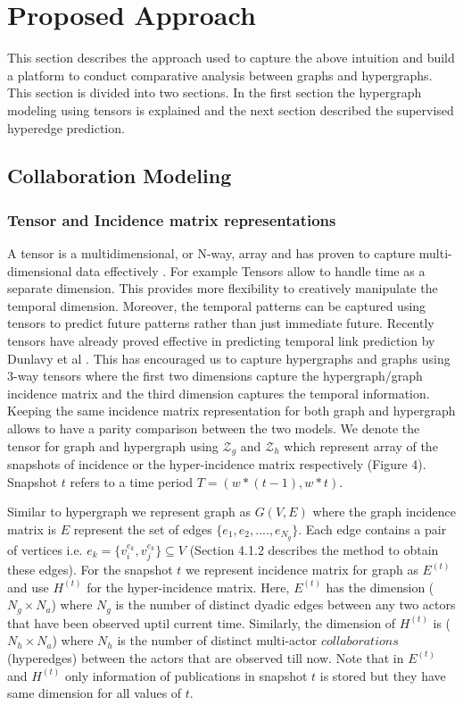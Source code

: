 \documentclass[twoside,leqno,twocolumn]{article}
\begin{document}
\section{Proposed Approach}

This section describes the approach used to capture the above intuition and build a platform to conduct comparative analysis between graphs and hypergraphs. This section is divided into two sections. In the first section the hypergraph modeling using tensors is explained and the next section described the supervised hyperedge prediction. 

\subsection{Collaboration Modeling}

\subsubsection{Tensor and Incidence matrix representations}

A tensor is a multidimensional, or N-way, array \cite{pearson2012spectral} and has proven to capture multi-dimensional data effectively \cite{kolda07}. For example Tensors allow to handle time as a separate dimension. This provides more flexibility to creatively manipulate the temporal dimension. Moreover, the temporal patterns can be captured using tensors to predict future patterns rather than just immediate future. Recently tensors have already proved effective in predicting temporal link prediction by Dunlavy et al \cite{kolda11}. This has encouraged us to capture hypergraphs and graphs using 3-way tensors where the first two dimensions capture the hypergraph/graph incidence matrix and the third dimension captures the temporal information. Keeping the same incidence matrix representation for both graph and hypergraph allows to have a parity comparison between the two models. 
We denote the tensor for graph and hypergraph using $\mathscr{Z}_{g}$ and $\mathscr{Z}_{h}$ which represent array of the snapshots of incidence or the hyper-incidence matrix respectively (Figure 4). Snapshot \(t\) refers to a time period \(T=(w*(t-1), w*t)\). 

Similar to hypergraph we represent graph as \(G(V,E)\) where the graph incidence matrix is \(E\) represent the set of edges $\{e_1,e_2,....,e_{N_g}\}$. Each edge contains a pair of vertices i.e. \(e_k=\{v_i^{e_k},v_j^{e_k}\} \subseteq V\) (Section 4.1.2 describes the method to obtain these edges). For the snapshot \(t\) we represent incidence matrix for graph as \(E^{(t)}\) and use \(H^{(t)}\) for the hyper-incidence matrix. Here, \(E^{(t)}\) has the dimension (\(N_{g}\times N_{a}\)) where \(N_{g}\) is the number of distinct dyadic edges between any two actors that have been observed uptil current time. Similarly, the dimension of \(H^{(t)}\) is (\(N_{h}\times N_{a}\)) where \(N_{h}\) is the number of distinct multi-actor $collaborations$ (hyperedges) between the actors that are observed till now. Note that in \(E^{(t)}\) and \(H^{(t)}\) only information of publications in snapshot $t$ is stored but they have same dimension for all values of $t$.
\end{document}
